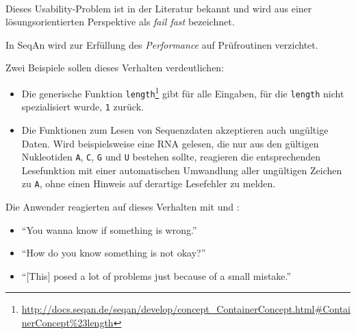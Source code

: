 \begin{itemize}
\begin{description}

      
    
    
    \item[\codebullet{apiua://code/-9223372036854775615}] \textbf{} \\
    Dieses Usability-Problem ist in der Literatur bekannt und wird aus einer lösungsorientierten Perspektive als \textit{fail fast} \citep{Bloch:2006jk} bezeichnet.
    
    In SeqAn wird zur Erfüllung des  \textit{Performance} auf Prüfroutinen verzichtet.
    
    Zwei Beispiele sollen dieses Verhalten verdeutlichen:
    \begin{itemize}
      \item Die generische Funktion \texttt{length}\footnote{\url{http://docs.seqan.de/seqan/develop/concept_ContainerConcept.html\#ContainerConcept\%23length}} gibt für alle Eingaben, für die \texttt{length} nicht spezialisiert wurde, \texttt{1} zurück.
      \item Die Funktionen zum Lesen von Sequenzdaten akzeptieren auch ungültige Daten. Wird beispielsweise eine RNA gelesen, die nur aus den gültigen Nukleotiden \texttt{A}, \texttt{C}, \texttt{G} und \texttt{U} bestehen sollte, reagieren die entsprechenden Lesefunktion mit einer automatischen Umwandlung aller ungültigen Zeichen zu \texttt{A}, ohne einen Hinweis auf derartige Lesefehler zu melden.
    \end{itemize}
    
    Die Anwender reagierten auf dieses Verhalten mit  und :
    \begin{itemize}
      \item ``You wanna know if something is wrong.''
      \item ``How do you know something is not okay?''
      \item ``[This] posed a lot of problems just because of a small mistake.''
    \end{itemize}
    

\end{description}
\end{itemize}
